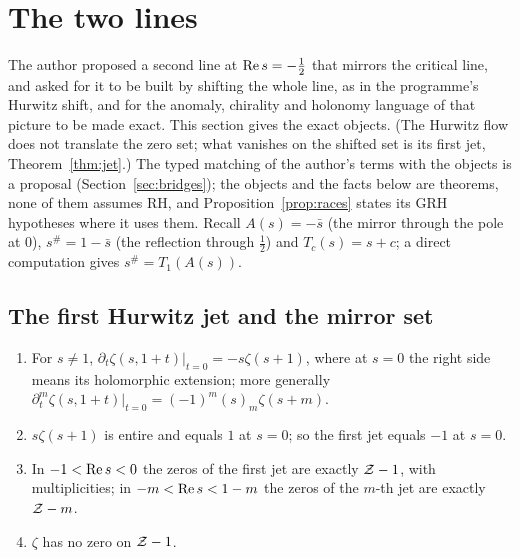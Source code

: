 \section{The two lines}\label{sec:twolines}

The author proposed a second line at $\operatorname{Re} s=-\tfrac12$ that mirrors the critical line, and asked for it to be built by shifting the whole line, as in the programme's Hurwitz shift, and for the anomaly, chirality and holonomy language of that picture to be made exact.
This section gives the exact objects. (The Hurwitz flow does not translate the zero set; what vanishes on the shifted set is its first jet, Theorem~\ref{thm:jet}.) The typed matching of the author's terms with the objects is a proposal (Section~\ref{sec:bridges}); the objects and the facts below are theorems, none of them assumes RH, and Proposition~\ref{prop:races} states its GRH hypotheses where it uses them.
Recall $A(s)=-\bar s$ (the mirror through the pole at $0$), $s^\#=1-\bar s$ (the reflection through $\tfrac12$) and $T_c(s)=s+c$; a direct computation gives $s^\#=T_1(A(s))$.

\subsection{The first Hurwitz jet and the mirror set}

\begin{theorem}\label{thm:jet}
\begin{enumerate}[label=(\alph*)]
\item For $s\ne1$, $\partial_t\zeta(s,1+t)|_{t=0}=-s\zeta(s+1)$, where at $s=0$ the right side means its holomorphic extension; more generally $\partial_t^m\zeta(s,1+t)|_{t=0}=(-1)^m(s)_m\zeta(s+m)$.
\item $s\zeta(s+1)$ is entire and equals $1$ at $s=0$; so the first jet equals $-1$ at $s=0$.
\item In $-1<\operatorname{Re} s<0$ the zeros of the first jet are exactly $\mathcal{Z}-1$, with multiplicities; in $-m<\operatorname{Re} s<1-m$ the zeros of the $m$-th jet are exactly $\mathcal{Z}-m$.
\item $\zeta$ has no zero on $\mathcal{Z}-1$.
\end{enumerate}
\end{theorem}

